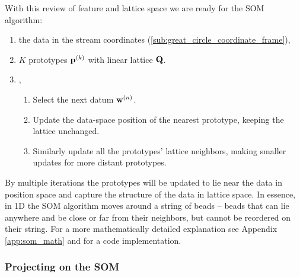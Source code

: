 \documentclass[fleqn,usenatbib]{mnras}
\begin{document}
      With this review of feature and lattice space we are ready for the SOM
      algorithm:

      \label{som_algorithm_steps}
      \begin{enumerate}[label={(\bfseries \arabic*):}, leftmargin=*]
      \itemsep0.5em
        \item {} the data in the stream coordinates
              (\autoref{sub:great_circle_coordinate_frame}),
        \item {} $K$ prototypes $\mathbf{p}^{(k)}$ with linear lattice
              $\mathbf{Q}$.
        \item {},
          \begin{enumerate}[label={(\bfseries \arabic*):}, leftmargin=*]
          \itemsep0.5em
            \item Select the next datum $\mathbf{w}^{(n)}$.
            \item Update the data-space position of the nearest prototype,
            keeping the lattice unchanged.
            \item Similarly update all the prototypes' lattice neighbors, making
            smaller updates for more distant prototypes.
          \end{enumerate}
      \end{enumerate}

      By multiple iterations the prototypes will be updated to lie near the data
      in position space and capture the structure of the data in lattice space.
      In essence, in 1D the SOM algorithm moves around a string of beads --
      beads that can lie anywhere and be close or far from their neighbors, but
      cannot be reordered on their string. For a more mathematically detailed
      explanation see Appendix \ref{app:som_math} and \trackstream{} for a code
      implementation.
      


    \subsubsection{Projecting on the SOM} \label{sub:som_projection}
\end{document}
